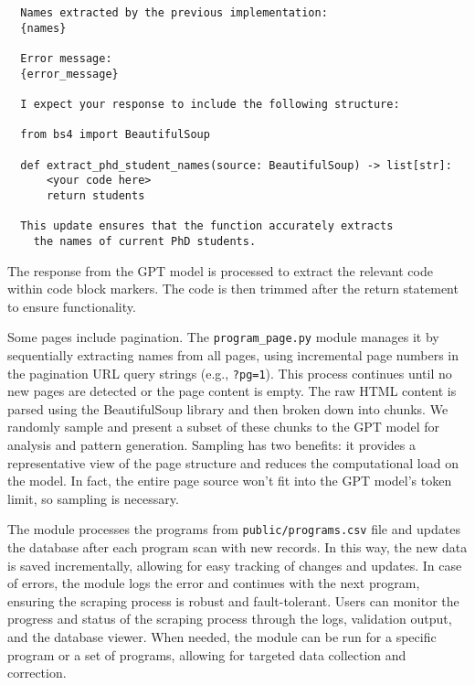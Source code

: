 \documentclass[11pt]{article}
\begin{document}
\begin{verbatim}
  Names extracted by the previous implementation:
  {names}

  Error message:
  {error_message}

  I expect your response to include the following structure:

  from bs4 import BeautifulSoup

  def extract_phd_student_names(source: BeautifulSoup) -> list[str]:
      <your code here>
      return students

  This update ensures that the function accurately extracts
    the names of current PhD students.
\end{verbatim}
%
The response from the GPT model is processed to extract the relevant code within code block markers. The code is then trimmed after the return statement to ensure functionality.


Some pages include pagination. The \texttt{program\_page.py} module manages it by sequentially extracting names from all pages, using incremental page numbers in the pagination URL query strings (e.g., \texttt{?pg=1}). This process continues until no new pages are detected or the page content is empty.
%
The raw HTML content is parsed using the BeautifulSoup library and then broken down into chunks. We randomly sample and present a subset of these chunks to the GPT model for analysis and pattern generation. Sampling has two benefits: it provides a representative view of the page structure and reduces the computational load on the model. In fact, the entire page source won't fit into the GPT model's token limit, so sampling is necessary.


The module processes the programs from \texttt{public/programs.csv} file and updates the database after each program scan with new records. In this way, the new data is saved incrementally, allowing for easy tracking of changes and updates. In case of errors, the module logs the error and continues with the next program, ensuring the scraping process is robust and fault-tolerant. Users can monitor the progress and status of the scraping process through the logs, validation output, and the database viewer. When needed, the module can be run for a specific program or a set of programs, allowing for targeted data collection and correction.
\end{document}
